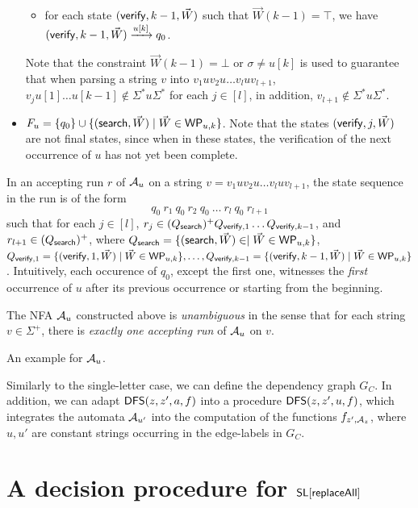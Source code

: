 \documentclass{llncs}
\begin{document}
\begin{itemize}
\begin{itemize}
%
\item for each state $(\mathsf{verify}, k-1, \vec{W})$ such that $\vec{W}(k-1)=\top$, we have $(\mathsf{verify}, k-1, \vec{W}) \xrightarrow{u[k]} q_0$.
%
\end{itemize}
Note that the constraint $\vec{W}(k-1) = \bot$ or $\sigma \neq u[k]$ is used to guarantee that when parsing a string $v$ into $v_1 u v_2 u \dots v_{l} u v_{l+1}$, $v_j u[1] \dots u[k-1] \not \in \Sigma^\ast u \Sigma^\ast$ for each $j \in [l]$, in addition, $v_{l+1} \not \in  \Sigma^\ast u \Sigma^\ast$.
%
\item $F_u=\{q_0\} \cup \{(\mathsf{search}, \vec{W}) \mid \vec{W} \in \mathsf{WP}_{u, k} \} $. Note that the states $(\mathsf{verify}, j, \vec{W})$ are not final states, since when in these states, the verification of the next occurrence of $u$ has not yet been complete.
\end{itemize}
In an accepting run $r$ of $\mathcal{A}_u$ on a string $v = v_1 u v_2 u \dots v_l u v_{l+1}$, the state sequence in the run is of the form 
$$q_0\ r_1\ q_0\ r_2\ q_0\ \dots\ r_l\ q_0\ r_{l+1}$$ 
such that  for each $j \in [l]$, $r_j \in (Q_{\mathsf{search}})^+ Q_{\mathsf{verify}, 1}  \dots  Q_{\mathsf{verify}, k-1}$, and $r_{l+1} \in (Q_{\mathsf{search}})^+$, where $Q_{\mathsf{search}}  = \{(\mathsf{search}, \vec{W}) \in \mid \vec{W} \in \mathsf{WP}_{u,k}\}$, $Q_{\mathsf{verify}, 1} = \{(\mathsf{verify}, 1, \vec{W}) \mid \vec{W} \in \mathsf{WP}_{u,k}\}, \dots, Q_{\mathsf{verify}, k-1}=\{(\mathsf{verify}, k-1, \vec{W}) \mid \vec{W} \in \mathsf{WP}_{u, k}\}$. Intuitively, each occurence of $q_0$, except the first one, witnesses the \emph{first} occurrence of $u$ after its previous occurrence or starting from the beginning.

The NFA $\mathcal{A}_u$ constructed above is \emph{unambiguous} in the sense that for each string $v \in \Sigma^+$, there is \emph{exactly one accepting run} of $\mathcal{A}_u$ on $v$.

\begin{example}
An example for $\mathcal{A}_u$.
\end{example}

Similarly to the single-letter case, we can define the dependency graph $G_C$. In addition, we can adapt $\mathsf{DFS}(z, z', a, f)$ into a procedure $\mathsf{DFS}(z, z', u, f)$, which integrates the automata $\mathcal{A}_{u'}$ into the computation of the functions $f_{z', \mathcal{A}_z}$, where $u,u'$ are constant strings occurring in the edge-labels in $G_C$.

\section{A decision procedure for $\mathsf{SL}[\mathsf{replaceAll}]$}
\end{document}
